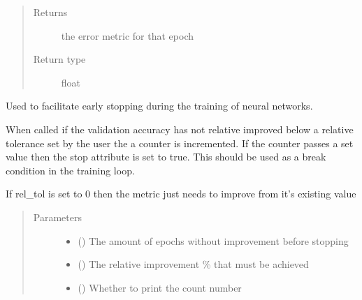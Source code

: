 \documentclass[letterpaper,10pt,english]{sphinxmanual}
\begin{document}
\begin{fulllineitems}
\begin{fulllineitems}
\begin{quote}
\begin{description}
\item[{Returns}] \leavevmode
the error metric for that epoch

\item[{Return type}] \leavevmode
float

\end{description}\end{quote}

\end{fulllineitems}


\end{fulllineitems}


\begin{fulllineitems}
\label{\detokenize{index:Forecaster.deeplearning.EarlyStopping}}
Used to facilitate early stopping during the training
of neural networks.

When called if the validation accuracy has not relative improved below a
relative tolerance set by the user the a counter is incremented. If the
counter passes a set value then the stop attribute is set to true. This
should be used as a break condition in the training loop.

If rel\_tol is set to 0 then the metric just needs to improve from it’s
existing value
\begin{quote}\begin{description}
\item[{Parameters}] \leavevmode\begin{itemize}
\item {} 
 () \textendash{} The amount of epochs without improvement before stopping

\item {} 
 () \textendash{} The relative improvement \% that must be achieved

\item {} 
 () \textendash{} Whether to print the count number


\end{itemize}
\end{description}
\end{quote}
\end{fulllineitems}
\end{document}
